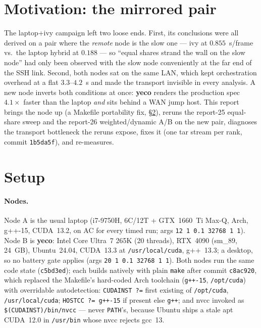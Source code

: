\documentclass[
	english,
	letterpaper, oneside
]{article}
\begin{document}
\section{Motivation: the mirrored pair}
\label{sec:motivation}

The laptop+ivy campaign left two loose ends. First, its conclusions were
all derived on a pair where the \emph{remote} node is the slow one --- ivy
at $0.855$~s/frame vs.\ the laptop hybrid at $0.188$ ---
so ``equal shares strand the wall on the slow node'' had only been
observed with the slow node conveniently at the far end of the SSH link.
Second, both nodes sat on the same LAN, which kept orchestration overhead
at a flat $3.3$--$4.2$~s and made the transport invisible in every
analysis. A new node inverts both conditions at once: \textbf{yeco}
renders the production spec $4.1\times$ faster than the laptop \emph{and}
sits behind a WAN jump host. This report brings the node up (a Makefile
portability fix, \S\ref{sec:setup}), reruns the report-25 equal-share
sweep and the report-26 weighted/dynamic A/B on the new pair, diagnoses
the transport bottleneck the reruns expose, fixes it (one tar stream per
rank, commit \texttt{1b5da5f}), and re-measures.

\section{Setup}
\label{sec:setup}

\paragraph{Nodes.} Node A is the usual laptop (i7-9750H, 6C/12T +
GTX~1660~Ti Max-Q, Arch, g++-15, CUDA~13.2, on AC for every timed run;
args \texttt{12 1 0.1 32768 1 1}). Node B is \textbf{yeco}: Intel
Core Ultra~7 265K (20 threads), RTX~4090 (sm\_89, 24~GB), Ubuntu~24.04,
CUDA~13.3 at \texttt{/usr/local/cuda}, g++~13.3; a desktop, so no
battery gate applies (args \texttt{20 1 0.1 32768 1 1}). Both nodes run
the same code state (\texttt{c5bd3ed}); each builds natively with plain
\texttt{make} after commit \texttt{c8ac920}, which replaced the
Makefile's hard-coded Arch toolchain (\texttt{g++-15},
\texttt{/opt/cuda}) with overridable autodetection: \texttt{CUDAINST ?=}
first existing of \texttt{/opt/cuda}, \texttt{/usr/local/cuda};
\texttt{HOSTCC ?= g++-15} if present else \texttt{g++}; and nvcc invoked
as \texttt{\$(CUDAINST)/bin/nvcc} --- never \texttt{PATH}'s, because
Ubuntu ships a stale apt CUDA~12.0 in \texttt{/usr/bin} whose nvcc
rejects gcc~13.
\end{document}
